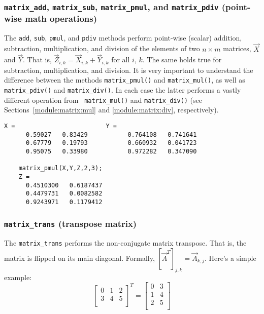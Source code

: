 \subsubsection{{\tt matrix\_add}, {\tt matrix\_sub}, {\tt matrix\_pmul},
and {\tt matrix\_pdiv} (point-wise math operations)}
\label{module:matrix:mathop}
The {\tt add}, {\tt sub}, {\tt pmul}, and {\tt pdiv} methods perform
point-wise (scalar) addition, subtraction, multiplication, and division of the elements
of two $n \times m$ matrices, $\vec{X}$ and $\vec{Y}$.
That is, $\vec{Z}_{i,k} = \vec{X}_{i,k} + \vec{Y}_{i,k}$ for all $i$, $k$.
The same holds true for subtraction, multiplication, and division.
It is very important to understand the difference between the methods
{\tt matrix\_pmul()} and {\tt matrix\_mul()}, as well as
{\tt matrix\_pdiv()} and {\tt matrix\_div()}.
In each case the latter performs a vastly different operation from {\tt
matrix\_mul()} and {\tt matrix\_div()}
(see Sections~\ref{module:matrix:mul} and \ref{module:matrix:div},
respectively).
%
\begin{Verbatim}[fontsize=\small]
    X =                         Y =
      0.59027   0.83429           0.764108   0.741641
      0.67779   0.19793           0.660932   0.041723
      0.95075   0.33980           0.972282   0.347090

    matrix_pmul(X,Y,Z,2,3);
    Z =
      0.4510300   0.6187437
      0.4479731   0.0082582
      0.9243971   0.1179412
\end{Verbatim}

\subsubsection{{\tt matrix\_trans} (transpose matrix)}
\label{module:matrix:trans}
The {\tt matrix\_trans} performs the non-conjugate matrix transpose.
That is, the matrix is flipped on its main diagonal.
Formally, $[\vec{A}^T]_{j,k} = \vec{A}_{k,j}$.
Here's a simple example:
\[
    \left[
    \begin{array}{ccc}
    0 & 1 & 2 \\
    3 & 4 & 5 \\
    \end{array}
    \right]^T
    =
    \left[
    \begin{array}{cc}
    0 & 3 \\
    1 & 4 \\
    2 & 5 \\
    \end{array}
    \right]
\]


